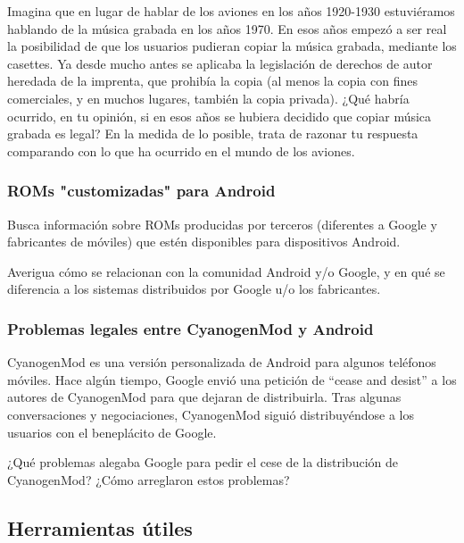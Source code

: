 \documentclass[a4paper,12pt]{article}
\begin{document}
Imagina que en lugar de hablar de los aviones en los años 1920-1930 estuviéramos hablando de la música grabada en los años 1970. En esos años empezó a ser real la posibilidad de que los usuarios pudieran copiar la música grabada, mediante los casettes. Ya desde mucho antes se aplicaba la legislación de derechos de autor heredada de la imprenta, que prohibía la copia (al menos la copia con fines comerciales, y en muchos lugares, también la copia privada). ¿Qué habría ocurrido, en tu opinión, si en esos años se hubiera decidido que copiar música grabada es legal? En la medida de lo posible, trata de razonar tu respuesta comparando con lo que ha ocurrido en el mundo de los aviones.

\subsubsection{ROMs "customizadas" para Android}
\label{sec:roms-cust-para}

Busca información sobre ROMs producidas por terceros (diferentes a
Google y fabricantes de móviles) que estén disponibles para
dispositivos Android.

Averigua cómo se relacionan con la comunidad Android y/o Google, y en
qué se diferencia a los sistemas distribuidos por Google u/o los
fabricantes.

\subsubsection{Problemas legales entre CyanogenMod y Android}
\label{sec:probl-legal-entre}

CyanogenMod es una versión personalizada de Android para algunos
teléfonos móviles. Hace algún tiempo, Google envió una petición de
``cease and desist'' a los autores de CyanogenMod para que dejaran de
distribuirla. Tras algunas conversaciones y negociaciones, CyanogenMod
siguió distribuyéndose a los usuarios con el beneplácito de Google.

¿Qué problemas alegaba Google para pedir el cese de la distribución de
CyanogenMod? ¿Cómo arreglaron estos problemas?

\subsection{Herramientas útiles}

\end{document}
